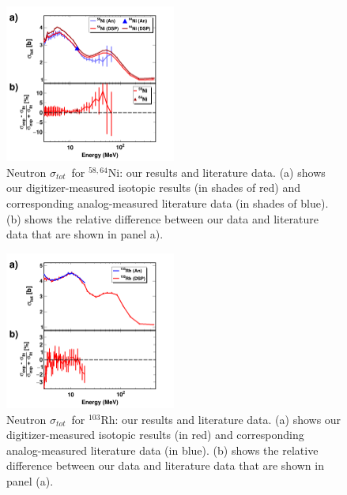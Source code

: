 \documentclass[twocolumn,secnumarabic,amssymb, nobibnotes, aps, prl,
superscriptaddress, nobalancelastpage]{revtex4}
\newcommand{\tot}{\ensuremath{\sigma_{tot}}}
\newcommand{\niEightFour}{\ensuremath{^{58,64}}N\lowercase{i}}
\newcommand{\rhThree}{\ensuremath{^{103}}R\lowercase{h}}
\begin{document}
\begin{figure}[tb]
    \centering
    \includegraphics[width=0.5\textwidth]{figures/TwoPanelNi.png}
    \caption[Neutron \tot\ for \niEightFour: our results and literature data]
    {
        Neutron \tot\ for \niEightFour: our results and literature data.
        (a) shows our digitizer-measured isotopic results (in shades of red) and
        corresponding analog-measured literature data \cite{Perey1993,
        Dukarevich1967} (in shades of blue). (b) shows the relative difference
        between our data and literature data that are shown in panel a).
    }
    \label{TwoPanelNi}
\end{figure}
\begin{figure}[tb]
    \centering
    \includegraphics[width=0.5\textwidth]{figures/TwoPanelRh.png}
    \caption[Neutron \tot\ for \rhThree: our results and literature data]
    {
        Neutron \tot\ for \rhThree: our results and literature data.
        (a) shows our digitizer-measured isotopic results (in red) and
        corresponding analog-measured literature data \cite{Poenitz1983} (in blue).
        (b) shows the relative difference
        between our data and literature data that are shown in panel (a).
    }
    \label{TwoPanelRh}
\end{figure}
\end{document}
